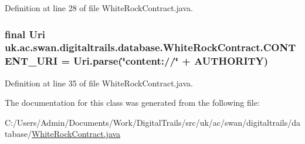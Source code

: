 Definition at line 28 of file White\+Rock\+Contract.\+java.

\hypertarget{classuk_1_1ac_1_1swan_1_1digitaltrails_1_1database_1_1_white_rock_contract_abfe96759bfe16773a98099536eef2306}{
\subsubsection[{C\+O\+N\+T\+E\+N\+T\+\_\+\+U\+R\+I}]{\setlength{\rightskip}{0pt plus 5cm}final Uri uk.\+ac.\+swan.\+digitaltrails.\+database.\+White\+Rock\+Contract.\+C\+O\+N\+T\+E\+N\+T\+\_\+\+U\+R\+I = Uri.\+parse(\char`\"{}content\+://\char`\"{} + A\+U\+T\+H\+O\+R\+I\+T\+Y)\hspace{0.3cm}{\ttfamily [static]}}}\label{classuk_1_1ac_1_1swan_1_1digitaltrails_1_1database_1_1_white_rock_contract_abfe96759bfe16773a98099536eef2306}


Definition at line 35 of file White\+Rock\+Contract.\+java.



The documentation for this class was generated from the following file\+:\begin{DoxyCompactItemize}
\item 
C\+:/\+Users/\+Admin/\+Documents/\+Work/\+Digital\+Trails/src/uk/ac/swan/digitaltrails/database/\hyperlink{_white_rock_contract_8java}{White\+Rock\+Contract.\+java}\end{DoxyCompactItemize}
